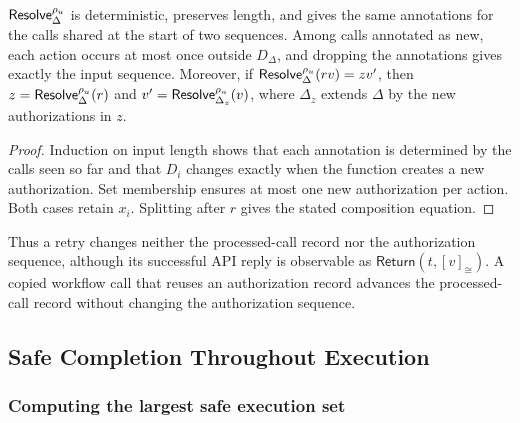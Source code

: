\begin{lemma}
\label{lem:resolution}
\(\mathsf{Resolve}^{\rho_u}_\Delta\) is deterministic, preserves length, and gives the same annotations for the calls shared at the start of two sequences.
Among calls annotated as new, each action occurs at most once outside \(D_\Delta\), and dropping the annotations gives exactly the input sequence.
Moreover, if \(\mathsf{Resolve}^{\rho_u}_\Delta(rv)=zv'\), then \(z=\mathsf{Resolve}^{\rho_u}_\Delta(r)\) and \(v'=\mathsf{Resolve}^{\rho_u}_{\Delta_z}(v)\), where \(\Delta_z\) extends \(\Delta\) by the new authorizations in \(z\).
\end{lemma}
\begin{proof}
Induction on input length shows that each annotation is determined by the calls seen so far and that \(D_i\) changes exactly when the function creates a new authorization.
Set membership ensures at most one new authorization per action.
Both cases retain \(x_i\).
Splitting after \(r\) gives the stated composition equation.
\end{proof}
Thus a retry changes neither the processed-call record nor the authorization sequence, although its successful API reply is observable as \(\mathsf{Return}(t,[v]_{\cong})\).
A copied workflow call that reuses an authorization record advances the processed-call record without changing the authorization sequence.

\subsection{Safe Completion Throughout Execution}

\subsubsection{Computing the largest safe execution set}

